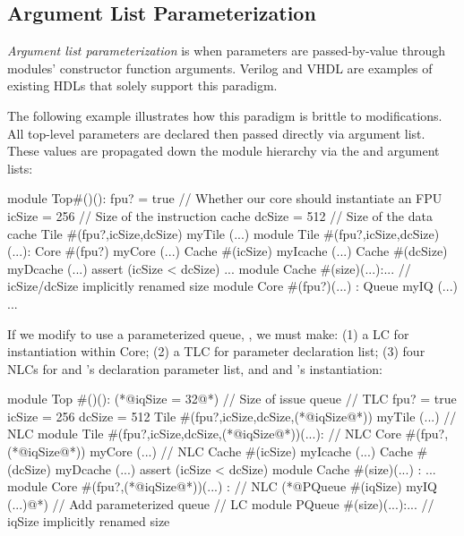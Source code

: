 \subsection{Argument List Parameterization}

\emph{Argument list parameterization} is when parameters are passed-by-value through modules' constructor function arguments. 
Verilog and VHDL are examples of existing HDLs that solely support this paradigm. 

The following example illustrates how this paradigm is brittle to modifications. All top-level parameters are declared then passed directly via  argument list. These values are propagated down the module hierarchy via the  and  argument lists:

\begin{phdl}
module Top#()():
  fpu? = true    // Whether our core should instantiate an FPU
  icSize = 256   // Size of the instruction cache
  dcSize = 512   // Size of the data cache
  Tile #(fpu?,icSize,dcSize) myTile (...)
module Tile #(fpu?,icSize,dcSize)(...):
  Core  #(fpu?) myCore (...)
  Cache #(icSize) myIcache (...)
  Cache #(dcSize) myDcache (...)
  assert (icSize < dcSize) ...
module Cache #(size)(...):... // icSize/dcSize implicitly renamed size
module Core #(fpu?)(...) :
  Queue myIQ (...) ...
\end{phdl} 

If we modify  to use a parameterized queue, , we must make: (1) a LC for  instantiation within Core; (2) a TLC for  parameter declaration list; (3) four NLCs for  and 's declaration parameter list, and  and 's instantiation:

\begin{phdl}
module Top #()():
  (*@\textcolor[rgb]{1,0,0}{iqSize = 32}@*)  // Size of issue queue                            // TLC
  fpu? = true
  icSize = 256 
  dcSize = 512
  Tile #(fpu?,icSize,dcSize,(*@\textcolor[rgb]{1,0,0}{iqSize}@*)) myTile (...)                 // NLC
module Tile #(fpu?,icSize,dcSize,(*@\textcolor[rgb]{1,0,0}{iqSize}@*))(...):                   // NLC
  Core #(fpu?,(*@\textcolor[rgb]{1,0,0}{iqSize}@*)) myCore (...)                               // NLC
  Cache #(icSize) myIcache (...)
  Cache #(dcSize) myDcache (...)
  assert (icSize < dcSize)
module Cache #(size)(...) : ... 
module Core #(fpu?,(*@\textcolor[rgb]{1,0,0}{iqSize}@*))(...) :                                // NLC
  (*@\textcolor[rgb]{1,0,0}{PQueue \#(iqSize) myIQ (...)}@*)  // Add parameterized queue        // LC
module PQueue #(size)(...):... // iqSize implicitly renamed size
\end{phdl}

